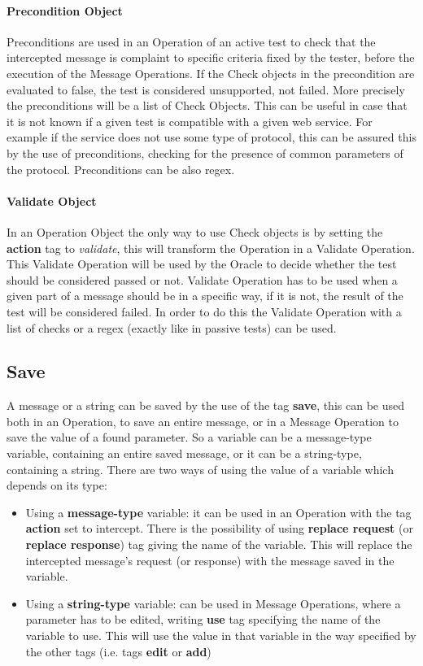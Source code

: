 \paragraph{Precondition Object}
Preconditions are used in an Operation of an active test to check that the intercepted message is complaint to specific criteria fixed by the tester, before the execution of the Message Operations. If the Check objects in the precondition are evaluated to false, the test is considered unsupported, not failed. More precisely the preconditions will be a list of Check Objects. This can be useful in case that it is not known if a given test is compatible with a given web service. For example if the service does not use some type of protocol, this can be assured this by the use of preconditions, checking for the presence of common parameters of the protocol. Preconditions can be also regex.
\paragraph{Validate Object}
In an Operation Object the only way to use Check objects is by setting the \textbf{action} tag to \textit{validate}, this will transform the Operation in a Validate Operation. This Validate Operation will be used by the Oracle to decide whether the test should be considered passed or not. Validate Operation has to be used when a given part of a message should be in a specific way, if it is not, the result of the test will be considered failed.
In order to do this the Validate Operation with a list of checks or a regex (exactly like in passive tests) can be used.

\subsection{Save}
A message or a string can be saved by the use of the tag \textbf{save}, this can be used both in an Operation, to save an entire message, or in a Message Operation to save the value of a found parameter. So a variable can be a message-type variable, containing an entire saved message, or it can be a string-type, containing a string.
There are two ways of using the value of a variable which depends on its type:
\begin{itemize}
    \item Using a \textbf{message-type} variable: it can be used in an Operation with the tag \textbf{action} set to intercept. There is the possibility of using \textbf{replace request} (or \textbf{replace response}) tag giving the name of the variable. This will replace the intercepted message's request (or response) with the message saved in the variable.
    \item Using a \textbf{string-type} variable: can be used in Message Operations, where a parameter has to be edited, writing \textbf{use} tag specifying the name of the variable to use. This will use the value in that variable in the way specified by the other tags (i.e. tags \textbf{edit} or \textbf{add})
\end{itemize}

